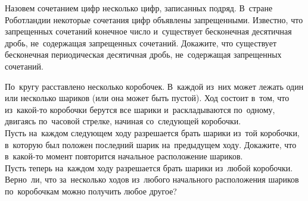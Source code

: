 \begin{problems}
\item
Назовем сочетанием цифр несколько цифр, записанных подряд.
В~стране Роботландии некоторые сочетания цифр объявлены запрещенными.
Известно, что запрещенных сочетаний конечное число и~существует бесконечная
десятичная дробь, не~содержащая запрещенных сочетаний.
Докажите, что существует бесконечная периодическая десятичная дробь,
не~содержащая запрещенных сочетаний.

\item
По~кругу расставлено несколько коробочек.
В~каждой из~них может лежать один или несколько шариков (или она может быть
пустой).
Ход состоит в~том, что из~какой-то коробочки берутся все шарики
и~раскладываются по~одному, двигаясь по~часовой стрелке, начиная со~следующей
коробочки.
\\
\sp
Пусть на~каждом следующем ходу разрешается брать шарики из~той коробочки,
в~которую был положен последний шарик на~предыдущем ходу.
Докажите, что в~какой-то момент повторится начальное расположение шариков.
\\
\sp
Пусть теперь на~каждом ходу разрешается брать шарики из~любой коробочки.
Верно~ли, что за~несколько ходов из~любого начального расположения шариков
по~коробочкам можно получить любое другое?

\end{problems}

